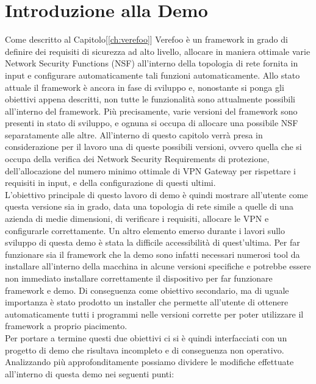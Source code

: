 \section{Introduzione alla Demo}
Come descritto al Capitolo[\ref{ch:verefoo}] Verefoo è un framework in grado di definire dei requisiti di sicurezza ad alto livello, allocare in maniera ottimale varie Network Security Functions (NSF) all'interno della topologia di rete fornita in input e configurare automaticamente tali funzioni 
automaticamente\cite{cit4}. Allo stato attuale il framework è ancora in fase di sviluppo e, nonostante si ponga gli obiettivi appena descritti, non tutte le funzionalità sono attualmente possibili all'interno del framework. Più precisamente, varie versioni del framework sono presenti in stato di sviluppo, e ognuna si occupa di allocare una possibile NSF separatamente alle altre.
All'interno di questo capitolo verrà presa in considerazione per il lavoro una di queste possibili versioni, ovvero quella che si occupa della verifica dei Network Security Requirements di protezione, dell'allocazione del numero minimo ottimale di VPN Gateway per rispettare i requisiti in input, e della configurazione di questi ultimi.\\
L'obiettivo principale di questo lavoro di demo è quindi mostrare all'utente come questa versione sia in grado, data una topologia di rete simile a quelle di una azienda di medie dimensioni, di verificare i requisiti, allocare le VPN e configurarle correttamente.
\newpage
Un altro elemento emerso durante i lavori sullo sviluppo di questa demo è stata la difficile accessibilità di quest'ultima. Per far funzionare sia il framework che la demo sono infatti necessari numerosi tool da installare all'interno della macchina in alcune versioni specifiche e potrebbe essere non immediato installare correttamente il dispositivo per far funzionare 
framework e demo. Di conseguenza come obiettivo secondario, ma di uguale importanza è stato prodotto un installer che permette all'utente di ottenere automaticamente tutti i programmi nelle versioni corrette per poter utilizzare il framework a proprio piacimento.
\\
Per portare a termine questi due obiettivi ci si è quindi interfacciati con un progetto di demo che risultava incompleto e di conseguenza non operativo. Analizzando più approfonditamente possiamo dividere le modifiche effettuate all'interno di questa demo nei seguenti punti:

